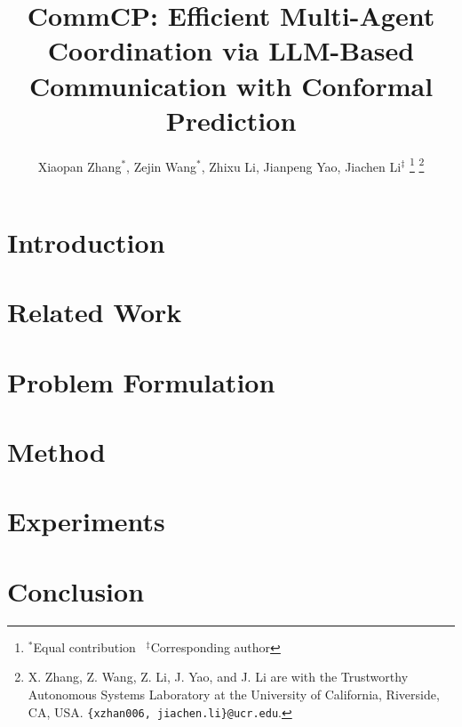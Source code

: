 \documentclass[letterpaper, 10 pt, conference]{ieeeconf}
\title{\LARGE \bf
CommCP: Efficient Multi-Agent Coordination via LLM-Based Communication with Conformal Prediction
}
\author{Xiaopan Zhang$^{*}$, Zejin Wang$^{*}$, Zhixu Li, Jianpeng Yao, Jiachen Li$^{\ddag}$
\thanks{$^*$Equal contribution \ $^\ddag$Corresponding author}
\thanks{X. Zhang, Z. Wang, Z. Li, J. Yao, and J. Li are with the Trustworthy Autonomous Systems Laboratory at the University of California, Riverside, CA, USA. {\tt\small \{xzhan006, jiachen.li\}@ucr.edu}.}
}
\begin{document}
\linespread{0.97}
\maketitle
\thispagestyle{empty}
\pagestyle{empty}



\begin{abstract}
    
\end{abstract}

\section{Introduction}\label{sec:introduction}
    
    
\section{Related Work}\label{sec:relatedwork}
    
 
\section{Problem Formulation}\label{sec:problemformulations}
    

\section{Method}\label{sec:multi_task_navigation}
    
    
\section{Experiments}\label{sec:experiments}
    

\section{Conclusion}\label{sec:conclusions}
    




\end{document}
